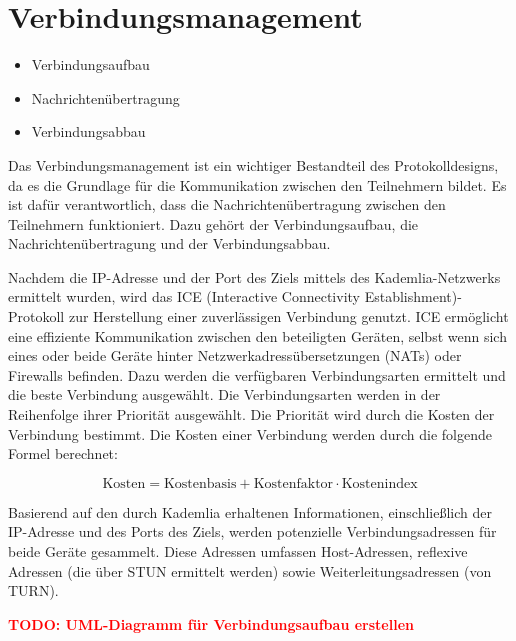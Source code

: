 \section{Verbindungsmanagement}
\label{subsec:routing}

\begin{itemize}
    \item Verbindungsaufbau
    \item Nachrichtenübertragung
    \item Verbindungsabbau
\end{itemize}


\noindent Das Verbindungsmanagement ist ein wichtiger Bestandteil des Protokolldesigns, da es die Grundlage für die Kommunikation zwischen den Teilnehmern bildet. Es ist dafür verantwortlich, dass die Nachrichtenübertragung zwischen den Teilnehmern funktioniert. Dazu gehört der Verbindungsaufbau, die Nachrichtenübertragung und der Verbindungsabbau.

Nachdem die IP-Adresse und der Port des Ziels mittels des Kademlia-Netzwerks ermittelt wurden, wird das ICE (Interactive Connectivity Establishment)-Protokoll zur Herstellung einer zuverlässigen Verbindung genutzt. ICE ermöglicht eine effiziente Kommunikation zwischen den beteiligten Geräten, selbst wenn sich eines oder beide Geräte hinter Netzwerkadressübersetzungen (NATs) oder Firewalls befinden. Dazu werden die verfügbaren Verbindungsarten ermittelt und die beste Verbindung ausgewählt. Die Verbindungsarten werden in der Reihenfolge ihrer Priorität ausgewählt. Die Priorität wird durch die Kosten der Verbindung bestimmt. Die Kosten einer Verbindung werden durch die folgende Formel berechnet:

\begin{equation}
    \label{eq:ice_kosten}
    \text{Kosten} = \text{Kostenbasis} + \text{Kostenfaktor} \cdot \text{Kostenindex}
\end{equation}








Basierend auf den durch Kademlia erhaltenen Informationen, einschließlich der IP-Adresse und des Ports des Ziels, werden potenzielle Verbindungsadressen für beide Geräte gesammelt. Diese Adressen umfassen Host-Adressen, reflexive Adressen (die über STUN ermittelt werden) sowie Weiterleitungsadressen (von TURN).




\textbf{\textcolor{red}{TODO: UML-Diagramm für Verbindungsaufbau erstellen}}









